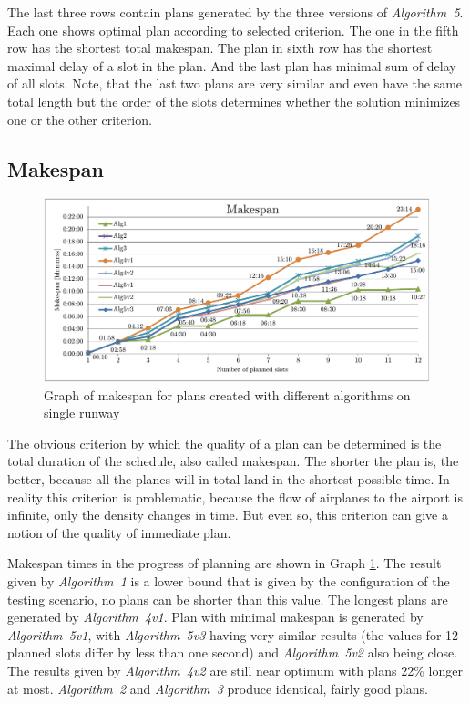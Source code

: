 The last three rows contain plans generated by the three versions of {\em Algorithm~5}. Each one shows optimal plan according to selected criterion. The one in the fifth row has the shortest total makespan. The plan in sixth row has the shortest maximal delay of a slot in the plan. And the last plan has minimal sum of delay of all slots. Note, that the last two plans are very similar and even have the same total length but the order of the slots determines whether the solution minimizes one or the other criterion.

\subsection{Makespan}

\begin{figure}[h]
    \centering
    \includegraphics[width=\textwidth]{graphs/1rwy-alternating-makespan.pdf}
    \caption{Graph of makespan for plans created with different algorithms on single runway}
    \label{graph:1rwy-alternating-makespan}
\end{figure}

The obvious criterion by which the quality of a plan can be determined is the total duration of the schedule, also called makespan. The shorter the plan is, the better, because all the planes will in total land in the shortest possible time. In reality this criterion is problematic, because the flow of airplanes to the airport is infinite, only the density changes in time. But even so, this criterion can give a notion of the quality of immediate plan.

Makespan times in the progress of planning are shown in Graph \ref{graph:1rwy-alternating-makespan}. The result given by {\em Algorithm~1} is a lower bound that is given by the configuration of the testing scenario, no plans can be shorter than this value. The longest plans are generated by {\em Algorithm~4v1}. Plan with minimal makespan is generated by {\em Algorithm~5v1}, with {\em Algorithm~5v3} having very similar results (the values for 12 planned slots differ by less than one second) and {\em Algorithm~5v2} also being close. The results given by {\em Algorithm~4v2} are still near optimum with plans 22\% longer at most. {\em Algorithm~2} and {\em Algorithm~3} produce identical, fairly good plans.

